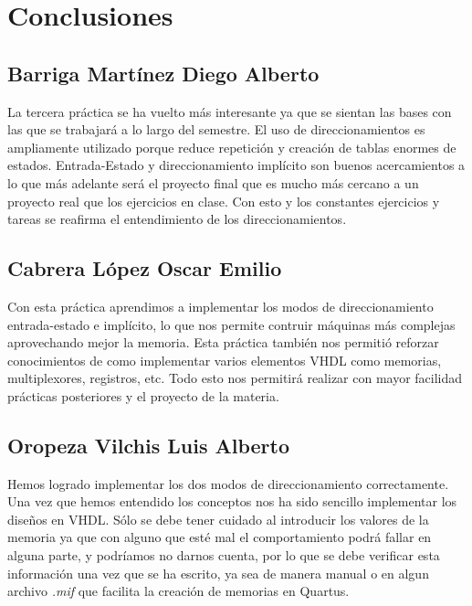 \documentclass[12pt]{article}
\def\luis{Oropeza Vilchis Luis Alberto}
\def\diego{Barriga Mart\'inez Diego Alberto}
\def\emilio{Cabrera L\'opez Oscar Emilio}
\begin{document}
\section*{Conclusiones}

\subsection*{\diego}
La tercera pr\'actica se ha vuelto m\'as interesante ya que se sientan las bases con las que se trabajar\'a a lo largo del semestre. El uso de direccionamientos es ampliamente utilizado porque reduce repetici\'on y creaci\'on de tablas enormes de estados. Entrada-Estado y direccionamiento impl\'icito son buenos acercamientos a lo que m\'as adelante ser\'a el proyecto final que es mucho m\'as cercano a un proyecto real que los ejercicios en clase. Con esto y los constantes ejercicios y tareas se reafirma el entendimiento de los direccionamientos.
\subsection*{\emilio}
Con esta pr\'actica aprendimos a implementar los modos de direccionamiento entrada-estado e impl\'icito, lo que nos permite contruir m\'aquinas m\'as complejas aprovechando mejor la memoria. Esta pr\'actica tambi\'en nos permiti\'o reforzar conocimientos de como implementar varios elementos VHDL como memorias, multiplexores, registros, etc. Todo esto nos permitir\'a realizar con mayor facilidad pr\'acticas posteriores y el proyecto de la materia.
\subsection*{\luis}
Hemos logrado implementar los dos modos de direccionamiento correctamente. Una vez que hemos entendido los conceptos nos ha sido sencillo implementar los diseños en VHDL. Sólo se debe tener cuidado al introducir los valores de la memoria ya que con alguno que esté mal el comportamiento podrá fallar en alguna parte, y podr\'iamos no darnos cuenta, por lo que se debe verificar esta información una vez que se ha escrito, ya sea de manera manual o en algun archivo \textit{.mif} que facilita la creaci\'on de memorias en Quartus.
\end{document}
